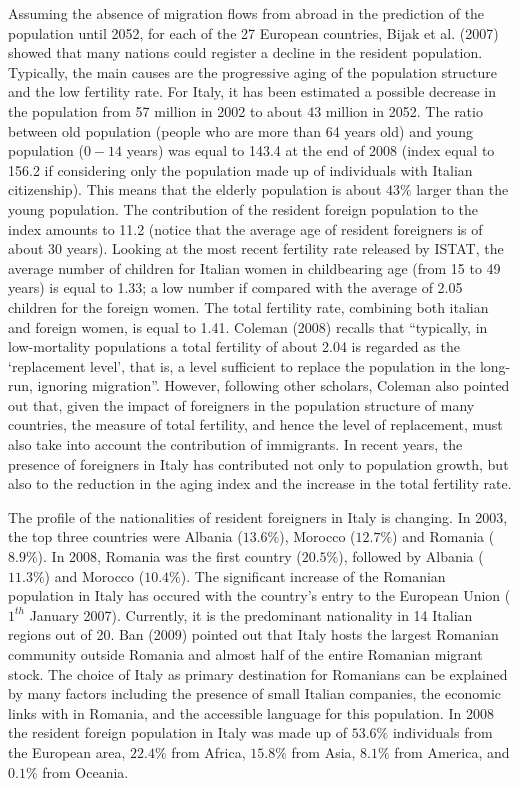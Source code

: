 \documentclass[10pt] {article}
\theoremstyle{definition}
\theoremstyle{plain}
\begin{document}
Assuming the absence of migration flows from abroad in the prediction of the population until 2052, for each of the 27 European countries, Bijak et al. (2007) showed that many nations could register a decline in the resident population. Typically, the main causes are the progressive aging of the population structure and the low fertility rate. For Italy, it has been estimated a possible decrease in the population from 57 million in 2002 to about 43 million in 2052. The ratio between old population (people who are more than 64 years old) and young population ($0-14$ years) was equal to 143.4 at the end of 2008 (index equal to 156.2 if considering only the population made up of individuals with Italian citizenship). This means that the elderly population is about $43\%$ larger than the young population. The contribution of the resident foreign population to the index amounts to 11.2 (notice that the average age of resident foreigners is of about 30 years). Looking at the most recent fertility rate released by ISTAT, the average number of children for Italian women in childbearing age (from 15 to 49 years) is equal to 1.33; a low number if compared with the average of 2.05 children for the foreign women. The total fertility rate, combining both italian and foreign women, is equal to 1.41. Coleman (2008) recalls that ``typically, in low-mortality populations a total fertility of about 2.04 is regarded as the `replacement level', that is, a level sufficient to replace the population in the long-run, ignoring migration''. However, following other scholars, Coleman also pointed out that, given the impact of foreigners in the population structure of many countries, the measure of total fertility, and hence the level of replacement, must also take into account the contribution of immigrants. In recent years, the presence of foreigners in Italy has contributed not only to population growth, but also to the reduction in the aging index and the increase in the total fertility rate. 

The profile of the nationalities of resident foreigners in Italy is changing. In 2003, the top three countries were Albania ($13.6\%$), Morocco ($12.7\%$) and Romania ($8.9\%$). In 2008, Romania was the first country ($20.5\%$), followed by Albania ($11.3\%$) and Morocco ($10.4\%$). The significant increase of the Romanian population in Italy has occured with the country's entry to the European Union ($1^{th}$ January 2007). Currently, it is the predominant nationality in 14 Italian regions out of 20. Ban (2009) pointed out that Italy hosts the largest Romanian community outside Romania and almost half of the entire Romanian migrant stock. The choice of Italy as primary destination for Romanians can be explained by many factors including the presence of small Italian companies, the economic links with in Romania, and the accessible language for this population. In 2008 the resident foreign population in Italy was made up of $53.6\%$ individuals from the European area, $22.4\%$ from Africa, $15.8\%$ from Asia, $8.1\%$ from America, and $0.1\%$ from Oceania.
\end{document}
